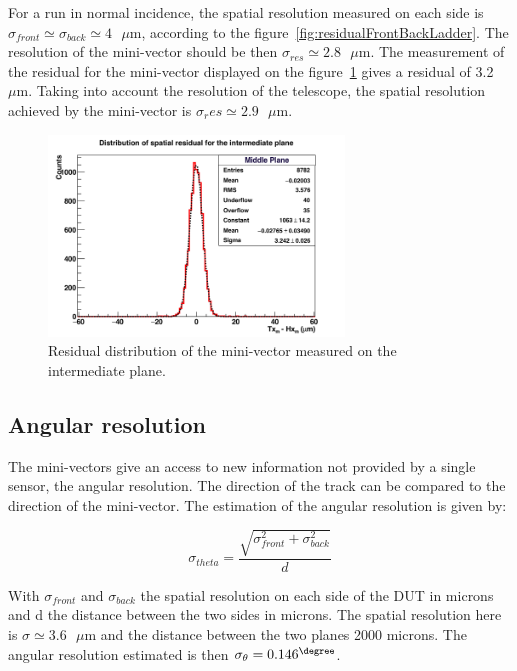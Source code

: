    For a run in normal incidence, the spatial resolution measured on each side is $\sigma_{front} \simeq \sigma_{back} \simeq 4 \text{ }\mu\text{m}$, according to the figure~\ref{fig:residualFrontBackLadder}.
    The resolution of the mini-vector should be then $\sigma_{res} \simeq 2.8 \text{ }\mu\text{m}$.
    The measurement of the residual for the mini-vector displayed on the figure~\ref{fig:residualMV} gives a residual of 3.2 $\mu\text{m}$.
    Taking into account the resolution of the telescope, the spatial resolution achieved by the mini-vector is $\sigma_res{} \simeq 2.9 \text{ }\mu\text{m}$.

    \begin{figure}[h]
      \centering
      \includegraphics[width = 0.7\textwidth]{Pictures/deformation/hDiffPosX_226056.png}
      \caption{Residual distribution of the mini-vector measured on the intermediate plane.}
      \label{fig:residualMV}
    \end{figure}

   \subsection{Angular resolution}

   The mini-vectors give an access to new information not provided by a single sensor, the angular resolution.
   The direction of the track can be compared to the direction of the mini-vector.
   The estimation of the angular resolution is given by:

   \begin{equation}
     \sigma_{theta} = \frac{\sqrt{\sigma_{front}^2 + \sigma_{back}^2}}{d}
     \label{eq:angularResolution}
   \end{equation}

   With $\sigma_{front}$ and $\sigma_{back}$ the spatial resolution on each side of the \gls{DUT} in microns and d the distance between the two sides in microns.
   The spatial resolution here is $\sigma \simeq 3.6 \text{ }\mu\text{m}$ and the distance between the two planes 2000 microns.
   The angular resolution estimated is then $\sigma_{\theta} = 0.146^{\degree}$.  
   
